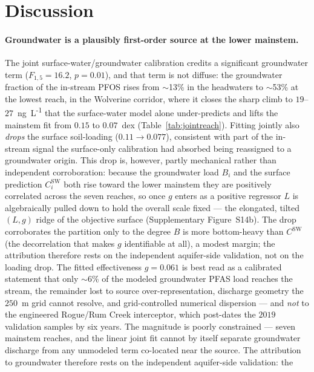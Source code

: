 \section{Discussion}
\label{sec:disc}

\paragraph{Groundwater is a plausibly first-order source at the lower mainstem.} The joint
surface-water/groundwater calibration credits a significant groundwater term ($F_{1,5}=16.2$,
$p=0.01$), and that term is not diffuse: the groundwater fraction of the in-stream PFOS rises from
$\sim$13\% in the headwaters to $\sim$53\% at the lowest reach, in the Wolverine corridor, where it
closes the sharp climb to $19$--$27$~ng~L\textsuperscript{-1} that the surface-water model alone
under-predicts and lifts the mainstem fit from $0.15$ to $0.07$~dex
(Table~\ref{tab:jointreach}). Fitting jointly also \emph{drops} the surface soil-loading
($0.11\to0.077$), consistent with part of the in-stream signal the surface-only calibration had
absorbed being reassigned to a groundwater origin. This drop is, however, partly mechanical rather than
independent corroboration: because the groundwater load $B_i$ and the surface prediction
$C^{\mathrm{SW}}_i$ both rise toward the lower mainstem they are positively correlated across the seven
reaches, so once $g$ enters as a positive regressor $L$ is algebraically pulled down to hold the overall
scale fixed --- the elongated, tilted $(L,g)$ ridge of the objective surface (Supplementary
Figure~S14b). The drop corroborates the partition only to the degree $B$ is more bottom-heavy than
$C^{\mathrm{SW}}$ (the decorrelation that makes $g$ identifiable at all), a modest margin; the
attribution therefore rests on the independent aquifer-side validation, not on the loading drop. The
fitted effectiveness $g=0.061$ is best read as a calibrated statement that only $\sim$6\% of the modeled
groundwater PFAS load reaches the stream, the remainder lost to source over-representation, discharge
geometry the $250$~m grid cannot resolve, and grid-controlled numerical dispersion --- and \emph{not} to
the engineered Rogue/Rum Creek interceptor, which post-dates the $2019$ validation samples by six years.
The magnitude is poorly constrained --- seven mainstem reaches, and the linear joint fit
cannot by itself separate groundwater discharge from any unmodeled term co-located near the source.
The attribution to groundwater therefore rests on the independent aquifer-side validation: the
